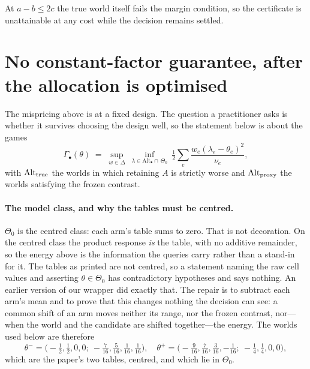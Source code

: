 At $a-b\le2c$ the true world itself fails the margin condition, so the certificate is
unattainable at any cost while the decision remains settled.


\section{No constant-factor guarantee, after the allocation is optimised}
\label{sec:separation}

The mispricing above is at a fixed design. The question a practitioner asks is whether it
survives choosing the design well, so the statement below is about the games
\[
\Gamma_{\bullet}(\theta)\;=\;\sup_{w\in\Delta}\ \inf_{\lambda\in\mathrm{Alt}_{\bullet}
\cap\,\Theta_{0}}\ \tfrac12\sum_{e}\frac{w_{e}(\lambda_{e}-\theta_{e})^{2}}{\nu_{e}},
\]
with $\mathrm{Alt}_{\rm true}$ the worlds in which retaining $A$ is strictly worse and
$\mathrm{Alt}_{\rm proxy}$ the worlds satisfying the frozen contrast.

\paragraph{The model class, and why the tables must be centred.}
$\Theta_{0}$ is the centred class: each arm's table sums to zero. That is not decoration.
On the centred class the product response \emph{is} the table, with no additive remainder,
so the energy above is the information the queries carry rather than a stand-in for it. The
tables as printed are not centred, so a statement naming the raw cell values and asserting
$\theta\in\Theta_{0}$ has contradictory hypotheses and says nothing. An earlier version of
our wrapper did exactly that. The repair is to subtract each arm's mean and to prove that
this changes nothing the decision can see: a common shift of an arm moves neither its range,
nor the frozen contrast, nor---when the world and the candidate are shifted together---the
energy. The worlds used below are therefore
\[
\theta^{-}=\bigl(-\tfrac12,\tfrac12,0,0;\ -\tfrac7{16},\tfrac5{16},\tfrac1{16},
\tfrac1{16}\bigr),\quad
\theta^{+}=\bigl(-\tfrac9{16},\tfrac7{16},\tfrac3{16},-\tfrac1{16};\
-\tfrac14,\tfrac14,0,0\bigr),
\]
which are the paper's two tables, centred, and which lie in $\Theta_{0}$.

